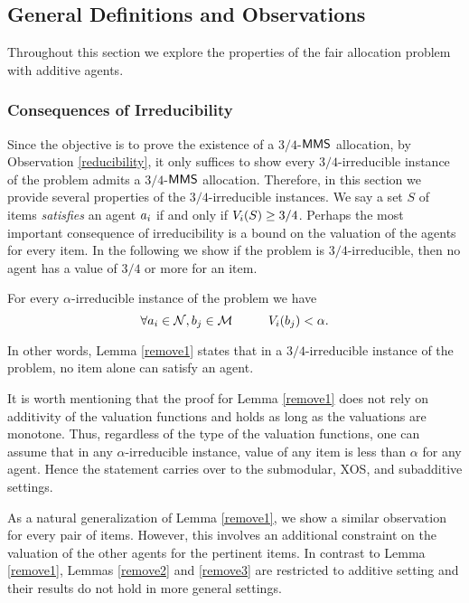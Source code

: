 \subsection{General Definitions and Observations}\label{additive:observations}
Throughout this section we explore the properties of the fair allocation problem with additive agents.
\subsubsection{Consequences of Irreducibility}
 Since the objective is to prove the existence of a $3/4$-$\mathsf{MMS}$ allocation, by Observation \ref{reducibility}, it only suffices to show every $3/4$-irreducible instance of the problem admits a $3/4$-$\mathsf{MMS}$ allocation. Therefore, in this section we provide several properties of the $3/4$-irreducible instances. We say a set $S$ of items \textit{satisfies} an agent $a_i$ if and only if $V_i(S) \geq 3/4$. Perhaps the most important consequence of irreducibility is a bound on the valuation of the agents for every item. In the following we show if the problem is $3/4$-irreducible, then no agent has a value of $3/4$ or more for an item. 

\begin{lemma}\label{remove1} 
For every $\alpha$-irreducible instance of the problem we have 
$$\forall a_i \in \mathcal{N}, b_j \in \mathcal{M} \hspace{1cm} V_i(b_j) < \alpha.$$
\end{lemma}

In other words, Lemma \ref{remove1} states that in a $3/4$-irreducible instance of the problem, no item alone can satisfy an agent. 

It is worth mentioning that the proof for Lemma \ref{remove1} does not rely on additivity of the valuation functions and holds as long as the valuations are monotone. Thus, regardless of the type of the valuation functions, one can assume that in any $\alpha$-irreducible instance, value of any item is less than $\alpha$ for any agent. Hence the statement carries over to the submodular, XOS, and subadditive settings. 



As a natural generalization of Lemma \ref{remove1}, we show a similar observation for every pair of items. However, this involves an additional constraint on the valuation of the other agents for the pertinent items. In contrast to Lemma \ref{remove1}, Lemmas \ref{remove2} and \ref{remove3} are restricted to additive setting and their results  do not hold in more general settings.


